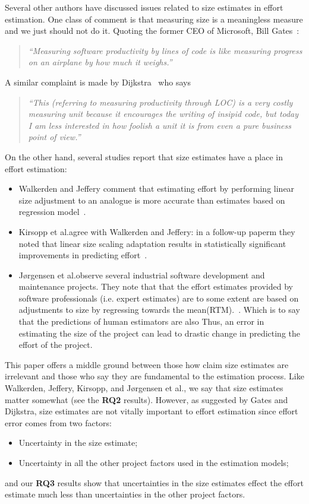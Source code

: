 \documentclass[final,twocolumn]{elsarticle}
\newcommand{\etal}{et al.}
\newcommand{\bi}{\begin{itemize}[leftmargin=0.4cm]}
\newcommand{\ei}{\end{itemize}}
\theoremstyle{break}
\begin{document}
Several other authors have discussed issues related to size estimates in effort
estimation.  One class of comment is that measuring size is a meaningless
measure and we just should not do it.  Quoting the former CEO of Microsoft, Bill
Gates~\cite{goll04}:
\begin{quote}{\em ``Measuring software productivity by lines of code is
  like measuring progress on an airplane by how much it weighs.''}\end{quote}
A similar
complaint is made by Dijkstra~\cite{dij88} who says\begin{quote}
{\em ``This (referring to
  measuring productivity through LOC) is a very costly measuring unit because it
  encourages the writing of insipid code, but today I am less interested in how
  foolish a unit it is from even a pure business point of view.''}
  \end{quote}
On the other hand, several studies report that size estimates have a place in
effort estimation:
\bi
\item
Walkerden and Jeffery comment that estimating effort by performing linear size
adjustment to an analogue is more accurate than estimates based on regression
model~\cite{Walkerden1999}.
\item
  Kirsopp \etal agree with Walkerden and Jeffery: in a follow-up paperm
they noted that  linear size scaling adaptation results in statistically
significant improvements in predicting
effort~\cite{kirsopp2003empirical}.
\item  J{\o}rgensen  \etal observe several industrial software development and
maintenance projects. They note that  that the effort estimates provided by software
professionals (i.e. expert estimates) are to some extent are based on adjustments
to size by regressing towards the mean(RTM).~\cite{jorgensen2003software}. Which is to say
that the predictions of human estimators are also Thus, an error in estimating the size
of the project can lead to drastic change in predicting the effort of the
project.
\ei
This paper offers a  middle ground between those how claim size estimates are irrelevant and those
who say they are fundamental to the estimation process.
 Like Walkerden, Jeffery, Kirsopp, and J{\o}rgensen  \etal, we say that size estimates matter somewhat (see the {\bf RQ2} results).
 However, as suggested by Gates and Dijkstra, size estimates are   not vitally important to effort estimation
 since effort error comes from two factors:
 \bi
\item Uncertainty in the size estimate;
\item Uncertainty in all the other project factors used in the estimation models;
  \ei
  and our {\bf RQ3} results show that
  uncertainties in the size estimates effect the effort estimate much less than uncertainties in the other project factors.
  
\end{document}
